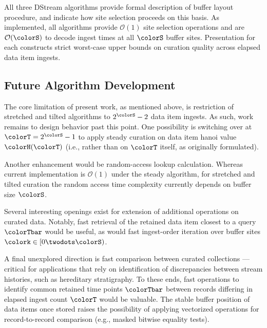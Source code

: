 All three DStream algorithms provide formal description of buffer layout procedure, and indicate how site selection proceeds on this basis.
As implemented, all algorithms provide $\mathcal{O}(1)$ site selection operations and are $\mathcal{O}(\colorS)$ to decode ingest times at all $\colorS$ buffer sites.
Presentation for each constructs strict worst-case upper bounds on curation quality across elapsed data item ingests.

\subsection{Future Algorithm Development}

The core limitation of present work, as mentioned above, is restriction of stretched and tilted algorithms to $2^{\colorS} - 2$ data item ingests.
As such, work remains to design behavior past this point.
One possibility is switching over at $\colorT = 2^{\colorS} - 1$ to apply steady curation on data item hanoi value $\colorH(\colorT)$ (i.e., rather than on $\colorT$ itself, as originally formulated).

Another enhancement would be random-access lookup calculation.
Whereas current implementation is $\mathcal{O}(1)$ under the steady algorithm, for stretched and tilted curation the random access time complexity currently depends on buffer size $\colorS$.

Several interesting openings exist for extension of additional operations on curated data.
Notably, fast retrieval of the retained data item closest to a query $\colorTbar$ would be useful, as would fast ingest-order iteration over buffer sites $\colork \in [0 \twodots \colorS)$.

A final unexplored direction is fast comparison between curated collections --- critical for applications that rely on identification of discrepancies between stream histories, such as hereditary stratigraphy.
To these ends, fast operations to identify common retained time points $\colorTbar$ between records differing in elapsed ingest count $\colorT$ would be valuable.
The stable buffer position of data items once stored raises the possibility of applying vectorized operations for record-to-record comparison (e.g., masked bitwise equality tests).


